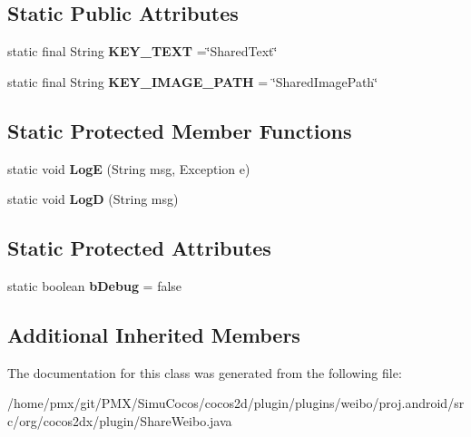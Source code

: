 \subsection*{Static Public Attributes}
\begin{DoxyCompactItemize}
\item 
\mbox{\label{classorg_1_1cocos2dx_1_1plugin_1_1ShareWeibo_ac18dec71ccd0f58f574cf067629fa773}} 
static final String {\bfseries K\+E\+Y\+\_\+\+T\+E\+XT} =\char`\"{}Shared\+Text\char`\"{}
\item 
\mbox{\label{classorg_1_1cocos2dx_1_1plugin_1_1ShareWeibo_a5dfba495af03d9f9a109fc3ee70c4141}} 
static final String {\bfseries K\+E\+Y\+\_\+\+I\+M\+A\+G\+E\+\_\+\+P\+A\+TH} = \char`\"{}Shared\+Image\+Path\char`\"{}
\end{DoxyCompactItemize}
\subsection*{Static Protected Member Functions}
\begin{DoxyCompactItemize}
\item 
\mbox{\label{classorg_1_1cocos2dx_1_1plugin_1_1ShareWeibo_a1db47cfc4d711bd3f71070a3fa4352f2}} 
static void {\bfseries LogE} (String msg, Exception e)
\item 
\mbox{\label{classorg_1_1cocos2dx_1_1plugin_1_1ShareWeibo_aea582af1b073fce2f2057b1615156547}} 
static void {\bfseries LogD} (String msg)
\end{DoxyCompactItemize}
\subsection*{Static Protected Attributes}
\begin{DoxyCompactItemize}
\item 
\mbox{\label{classorg_1_1cocos2dx_1_1plugin_1_1ShareWeibo_ad8f23ca143ff40c90f7f9dab26d101a5}} 
static boolean {\bfseries b\+Debug} = false
\end{DoxyCompactItemize}
\subsection*{Additional Inherited Members}


The documentation for this class was generated from the following file\+:\begin{DoxyCompactItemize}
\item 
/home/pmx/git/\+P\+M\+X/\+Simu\+Cocos/cocos2d/plugin/plugins/weibo/proj.\+android/src/org/cocos2dx/plugin/Share\+Weibo.\+java\end{DoxyCompactItemize}
